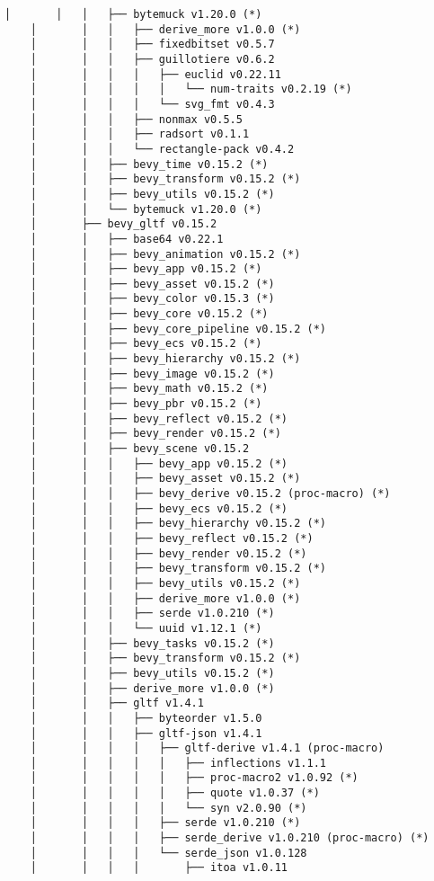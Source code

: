 \begin{lstlisting}[style=mystyle, caption={dependencias del proyecto}, label={lst:dependencias}]
    │       │   │   ├── bytemuck v1.20.0 (*)
    │       │   │   ├── derive_more v1.0.0 (*)
    │       │   │   ├── fixedbitset v0.5.7
    │       │   │   ├── guillotiere v0.6.2
    │       │   │   │   ├── euclid v0.22.11
    │       │   │   │   │   └── num-traits v0.2.19 (*)
    │       │   │   │   └── svg_fmt v0.4.3
    │       │   │   ├── nonmax v0.5.5
    │       │   │   ├── radsort v0.1.1
    │       │   │   └── rectangle-pack v0.4.2
    │       │   ├── bevy_time v0.15.2 (*)
    │       │   ├── bevy_transform v0.15.2 (*)
    │       │   ├── bevy_utils v0.15.2 (*)
    │       │   └── bytemuck v1.20.0 (*)
    │       ├── bevy_gltf v0.15.2
    │       │   ├── base64 v0.22.1
    │       │   ├── bevy_animation v0.15.2 (*)
    │       │   ├── bevy_app v0.15.2 (*)
    │       │   ├── bevy_asset v0.15.2 (*)
    │       │   ├── bevy_color v0.15.3 (*)
    │       │   ├── bevy_core v0.15.2 (*)
    │       │   ├── bevy_core_pipeline v0.15.2 (*)
    │       │   ├── bevy_ecs v0.15.2 (*)
    │       │   ├── bevy_hierarchy v0.15.2 (*)
    │       │   ├── bevy_image v0.15.2 (*)
    │       │   ├── bevy_math v0.15.2 (*)
    │       │   ├── bevy_pbr v0.15.2 (*)
    │       │   ├── bevy_reflect v0.15.2 (*)
    │       │   ├── bevy_render v0.15.2 (*)
    │       │   ├── bevy_scene v0.15.2
    │       │   │   ├── bevy_app v0.15.2 (*)
    │       │   │   ├── bevy_asset v0.15.2 (*)
    │       │   │   ├── bevy_derive v0.15.2 (proc-macro) (*)
    │       │   │   ├── bevy_ecs v0.15.2 (*)
    │       │   │   ├── bevy_hierarchy v0.15.2 (*)
    │       │   │   ├── bevy_reflect v0.15.2 (*)
    │       │   │   ├── bevy_render v0.15.2 (*)
    │       │   │   ├── bevy_transform v0.15.2 (*)
    │       │   │   ├── bevy_utils v0.15.2 (*)
    │       │   │   ├── derive_more v1.0.0 (*)
    │       │   │   ├── serde v1.0.210 (*)
    │       │   │   └── uuid v1.12.1 (*)
    │       │   ├── bevy_tasks v0.15.2 (*)
    │       │   ├── bevy_transform v0.15.2 (*)
    │       │   ├── bevy_utils v0.15.2 (*)
    │       │   ├── derive_more v1.0.0 (*)
    │       │   ├── gltf v1.4.1
    │       │   │   ├── byteorder v1.5.0
    │       │   │   ├── gltf-json v1.4.1
    │       │   │   │   ├── gltf-derive v1.4.1 (proc-macro)
    │       │   │   │   │   ├── inflections v1.1.1
    │       │   │   │   │   ├── proc-macro2 v1.0.92 (*)
    │       │   │   │   │   ├── quote v1.0.37 (*)
    │       │   │   │   │   └── syn v2.0.90 (*)
    │       │   │   │   ├── serde v1.0.210 (*)
    │       │   │   │   ├── serde_derive v1.0.210 (proc-macro) (*)
    │       │   │   │   └── serde_json v1.0.128
    │       │   │   │       ├── itoa v1.0.11

\end{lstlisting}
